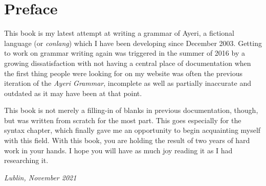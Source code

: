 \chapter{Preface}

This book is my latest attempt at writing a grammar of Ayeri, a fictional
language (or \emph{conlang}) which I have been developing since December
2003. Getting to work on grammar writing again was triggered in the summer of
2016 by a growing dissatisfaction with not having a central place of
documentation when the first thing people were looking for on my website was
often the previous iteration of the \emph{Ayeri Grammar}, incomplete as well as
partially inaccurate and outdated as it may have been at that point.

This book is not merely a filling-in of blanks in previous documentation,
though, but was written from scratch for the most part. This goes especially
for the syntax chapter, which finally gave me an opportunity to begin
acquainting myself with this field. With this book, you are holding the result
of two years of hard work in your hands. I hope you will have as much joy
reading it as I had researching it.

\begin{flushright}\itshape\footnotesize
Lublin, November 2021
\end{flushright}
